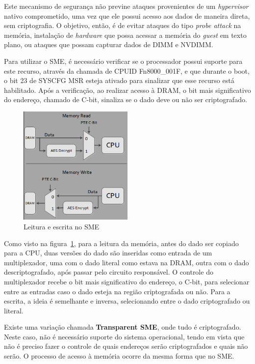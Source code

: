 \documentclass{report}
\begin{document}
Este mecanismo de segurança não previne ataques provenientes de um
\textit{hypervisor} nativo comprometido, uma vez que ele possui acesso aos
dados de maneira direta, sem criptografia. O objetivo, então, é de evitar
ataques do tipo \textit{probe attack} na memória, instalação de
\textit{hardware} que possa acessar a memória do \textit{guest} em texto plano,
ou ataques que possam capturar dados de DIMM e NVDIMM.

Para utilizar o SME, é necessário verificar se o processador possui suporte
para este recurso, através da chamada de CPUID Fn8000\_001F, e que durante o
boot, o bit 23 de SYSCFG MSR esteja ativado para sinalizar que esse recurso
está habilitado. Após a verificação, ao realizar acesso à DRAM, o bit mais
significativo do endereço, chamado de C-bit, sinaliza se o dado deve ou não ser
criptografado.

\begin{figure}[h]
    \centering
    \includegraphics[width=0.5\textwidth]{img/sme_read_write_architecture.png}
    \caption{Leitura e escrita no SME}\label{sme-read-write}
\end{figure}

Como visto na figura~\ref{sme-read-write}, para a leitura da memória, antes do
dado ser copiado para a CPU, duas versões do dado são inseridas como entrada de
um multiplexador, uma com o dado literal como estava na DRAM, outra com o dado
descriptografado, após passar pelo circuito responsável. O controle do
multiplexador recebe o bit mais significativo do endereço, o C-bit, para
selecionar entre as entradas caso o dado esteja na região criptografada ou não.
Para a escrita, a ideia é semelhante e inversa, selecionando entre o dado
criptografado ou literal.

Existe uma variação chamada \textbf{Transparent SME}, onde tudo é
criptografado. Neste caso, não é necessário suporte do sistema operacional,
tendo em vista que não é preciso fazer o controle de quais endereços serão
criptografados e quais não serão. O processo de acesso à memória ocorre da
mesma forma que no SME.
\end{document}
